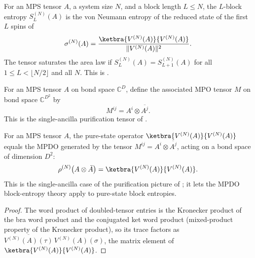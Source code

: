 \begin{definition}
    \label{def:pure_sal}
    \leanok
    For an MPS tensor $A$, a system size $N$, and a block length $L\le N$,
    the $L$-block entropy $S_L^{(N)}(A)$ is the von Neumann entropy of the
    reduced state of the first $L$ spins of
    \[
        \sigma^{(N)}(A)
        =
        \frac{\ketbra{V^{(N)}(A)}{V^{(N)}(A)}}{\|V^{(N)}(A)\|^2}.
    \]
    The tensor saturates the area law if
    $S_L^{(N)}(A) = S_{L+1}^{(N)}(A)$ for all
    $1 \le L < \lfloor N/2 \rfloor$ and all $N$.
    This is \cite[Definition~3.13, line~600]{Cirac2016MPDO_arXiv}.
\end{definition}

\begin{definition}\label{def:doubled_tensor}
    \leanok
    For an MPS tensor $A$ on bond space $\mathbb{C}^D$, define the associated
    MPO tensor $M$ on bond space $\mathbb{C}^{D^2}$ by
    \[
        M^{ij} = A^i \otimes \overline{A^j}.
    \]
    This is the single-ancilla purification tensor of
    \cite{Cirac2016MPDO_arXiv}.
\end{definition}

\begin{lemma}\label{lem:mpo_doubled}
    \leanok
    For an MPS tensor $A$, the pure-state operator
    $\ketbra{V^{(N)}(A)}{V^{(N)}(A)}$ equals the MPDO generated by the tensor
    $M^{ij} = A^i \otimes \overline{A^j}$, acting on a bond space of
    dimension $D^2$:
    \[
        \rho^{(N)}\bigl(A \otimes \bar A\bigr) = \ketbra{V^{(N)}(A)}{V^{(N)}(A)}.
    \]
    This is the single-ancilla case of the purification picture of
    \cite{Cirac2016MPDO_arXiv}; it lets the MPDO block-entropy
    theory apply to pure-state block entropies.
\end{lemma}
\begin{proof}\leanok
    The word product of doubled-tensor entries is the Kronecker product of the
    bra word product and the conjugated ket word product (mixed-product property
    of the Kronecker product), so its trace factors as
    $\overline{V^{(N)}(A)(\tau)}\,V^{(N)}(A)(\sigma)$, the matrix element of
    $\ketbra{V^{(N)}(A)}{V^{(N)}(A)}$.
\end{proof}


